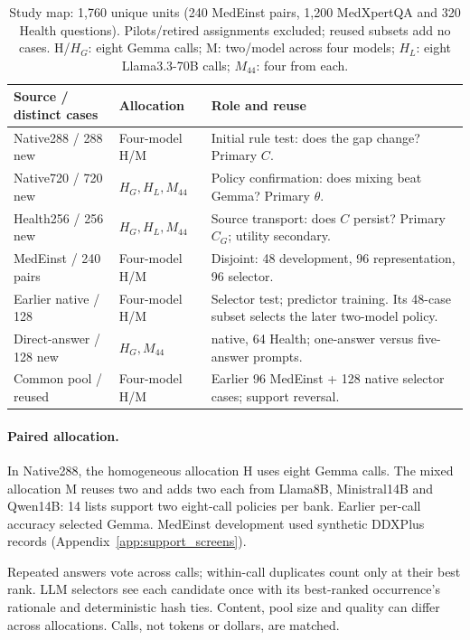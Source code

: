 \documentclass{article}
\begin{document}
\begin{table}[t]
\centering\small
\caption{Study map: 1,760 unique units (240 MedEinst pairs, 1,200 MedXpertQA and 320 Health questions). Pilots/retired assignments excluded; reused subsets add no cases. H/$H_G$: eight Gemma calls; M: two/model across four models; $H_L$: eight Llama3.3-70B calls; $M_{44}$: four from each.}
\label{tab:identification}
\begin{tabular}{>{\raggedright\arraybackslash}p{.26\linewidth}>{\raggedright\arraybackslash}p{.21\linewidth}>{\raggedright\arraybackslash}p{.42\linewidth}}
\toprule
Source / distinct cases & Allocation & Role and reuse\\
\midrule
Native288 / 288 new & Four-model H/M & Initial rule test: does the gap change? Primary $C$.\\
Native720 / 720 new & $H_G,H_L,M_{44}$ & Policy confirmation: does mixing beat Gemma? Primary $\theta$.\\
Health256 / 256 new & $H_G,H_L,M_{44}$ & Source transport: does $C$ persist? Primary $C_G$; utility secondary.\\
MedEinst / 240 pairs & Four-model H/M & Disjoint: 48 development, 96 representation, 96 selector.\\
Earlier native / 128 & Four-model H/M & Selector test; predictor training. Its 48-case subset selects the later two-model policy.\\
Direct-answer / 128 new & $H_G,M_{44}$ & 64 native, 64 Health; one-answer versus five-answer prompts.\\
Common pool / reused & Four-model H/M & Earlier 96 MedEinst + 128 native selector cases; support reversal.\\
\bottomrule
\end{tabular}
\end{table}

\paragraph{Paired allocation.}
In Native288, the homogeneous allocation H uses eight Gemma calls. The mixed allocation M reuses two and adds two each from Llama8B, Ministral14B and Qwen14B: 14 lists support two eight-call policies per bank. Earlier per-call accuracy selected Gemma. MedEinst development \citep{chen2026medeinst} used synthetic DDXPlus records \citep{tchango2022ddxplus} (Appendix~\ref{app:support_screens}).

Repeated answers vote across calls; within-call duplicates count only at their best rank. LLM selectors see each candidate once with its best-ranked occurrence's rationale and deterministic hash ties. Content, pool size and quality can differ across allocations. Calls, not tokens or dollars, are matched.
\end{document}

